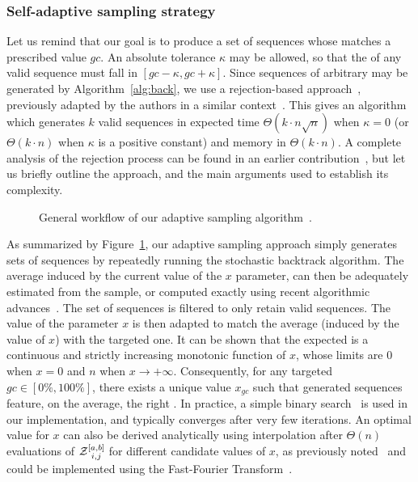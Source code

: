 \subsubsection{Self-adaptive sampling strategy}

Let us remind that our goal is to produce a set of sequences whose \GCContent matches a prescribed value $gc$.
An absolute tolerance $\kappa$ may be allowed, so that the \GCContent of any valid sequence must fall in  
$[gc-\kappa,gc+\kappa]$. Since sequences of arbitrary \GCContent may be generated by Algorithm~\ref{alg:back}, we use a rejection-based approach~\citep{Bodini2010}, previously adapted by the authors in a similar context~\citep{Waldispuhl2011}. This gives an algorithm which generates $k$ valid sequences in expected time $\Theta(k\cdot n\sqrt{n})$ when $\kappa=0$ (or $\Theta(k\cdot n)$ when $\kappa$ is a positive constant) and memory in $\Theta(k\cdot n)$.
A complete analysis of the rejection process can be found in an earlier contribution~\citep{Waldispuhl2011}, but let us briefly outline the approach, and the main arguments used to establish its complexity.

\begin{figure}
\resizebox{\linewidth}{!}{}
\caption{General workflow of our adaptive sampling algorithm~\citep{Waldispuhl2011}.}
\label{fig:workflow}
\end{figure}

As summarized by Figure~\ref{fig:workflow}, our adaptive sampling approach simply generates sets of sequences by repeatedly running the stochastic backtrack algorithm. The average \GCContent induced by the current value of the $x$ parameter, can then be adequately estimated from the sample, or computed exactly using recent algorithmic advances~\citep{Ponty2011}. The set of sequences is filtered to only retain valid sequences. The value of the parameter $x$ is then adapted to match the average \GCContent (induced by the value of $x$) with the targeted one.
It can be shown that the expected \GCContent is a continuous and strictly increasing monotonic function of $x$, whose limits are $0$ when $x=0$ and $n$ when $x\to +\infty$. Consequently, for any targeted \GCContent $gc\in[0\%,100\%]$, there exists a unique value $x_{gc}$ such that generated sequences feature, on the average, the right \GCContent.
In practice, a simple binary search~\citep{Waldispuhl2011} is used in our implementation, and typically converges after very few iterations. An optimal value for $x$ can also be derived analytically using interpolation after $\Theta(n)$ evaluations of $\Z{i,j}{a,b}$ for different candidate values of $x$, as previously noted~\citep{Waldispuhl2011} and could be implemented using the Fast-Fourier Transform~\citep{Senter2012}.

